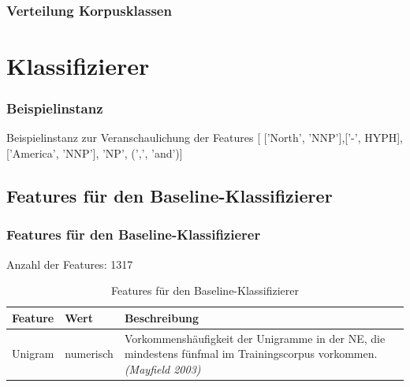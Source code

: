 \documentclass{beamer}
\begin{document}
	\begin{frame}
			\frametitle{Verteilung Korpusklassen}
			 \begin{table}
			 	\caption{Verteilung der Klassen nach Balancierung}
			 	\label{tab:datasets}
			 \end{table}
	\end{frame}


\section{Klassifizierer}
	\begin{frame}
		\frametitle{Beispielinstanz}
		\begin{exampleblock}{Beispielinstanz zur Veranschaulichung der Features}
		[ ['North', 'NNP'],['-', HYPH], ['America', 'NNP'], 'NP', (',', 'and')]
	\end{exampleblock}
		
	\end{frame}
	\subsection{Features für den Baseline-Klassifizierer}
	\begin{frame}
		\frametitle{Features für den Baseline-Klassifizierer}
		Anzahl der Features: 1317
					 \begin{table}
					 	\small
					 	\caption{Features für den Baseline-Klassifizierer}
					 	\begin{tabularx}{\textwidth}{llX}
					 		\toprule
							Feature & Wert & Beschreibung\\
					 		\midrule
					 		Unigram & numerisch & Vorkommenshäufigkeit der Unigramme in der NE, die mindestens fünfmal im Trainingscorpus vorkommen. \textit{(Mayfield 2003)} \\
					 		\bottomrule
					 	\end{tabularx}
					 	\label{tab:baselinef}
					 \end{table}
	\end{frame}
\end{document}
